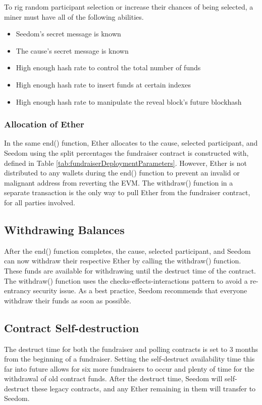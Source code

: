 \documentclass[11pt]{article}
\begin{document}
To rig random participant selection or increase their chances of being selected, a miner must have all of the following abilities.

\begin{itemize}
\item{Seedom's secret message is known}
\item{The cause's secret message is known}
\item{High enough hash rate to control the total number of funds}
\item{High enough hash rate to insert funds at certain indexes}
\item{High enough hash rate to manipulate the reveal block's future blockhash}
\end{itemize}

\subsubsection{Allocation of Ether}

In the same end() function, Ether allocates to the cause, selected participant, and Seedom using the split percentages the fundraiser contract is constructed with, defined in Table \ref{tab:fundraiserDeploymentParameters}. However, Ether is not distributed to any wallets during the end() function to prevent an invalid or malignant address from reverting the EVM. The withdraw() function in a separate transaction is the only way to pull Ether from the fundraiser contract, for all parties involved.

\subsection{Withdrawing Balances}

After the end() function completes, the cause, selected participant, and Seedom can now withdraw their respective Ether by calling the withdraw() function. These funds are available for withdrawing until the destruct time of the contract. The withdraw() function uses the checks-effects-interactions pattern \cite{7} to avoid a re-entrancy security issue. As a best practice, Seedom recommends that everyone withdraw their funds as soon as possible.

\subsection{Contract Self-destruction}
\label{sec:contractSelfDestruction}

The destruct time for both the fundraiser and polling contracts is set to 3 months from the beginning of a fundraiser. Setting the self-destruct availability time this far into future allows for six more fundraisers to occur and plenty of time for the withdrawal of old contract funds. After the destruct time, Seedom will self-destruct these legacy contracts, and any Ether remaining in them will transfer to Seedom.
\end{document}

